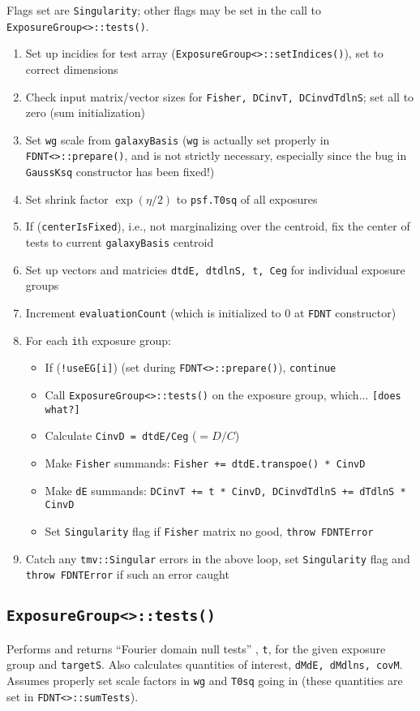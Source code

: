 \documentclass[useAMS,usenatbib,usegraphicx]{mn2e}
\begin{document}
Flags set are {\tt Singularity}; other flags may be set in the call to 
{\tt ExposureGroup<>::tests()}.

\begin{enumerate}
\item Set up incidies for test array ({\tt ExposureGroup<>::setIndices()}), set to correct dimensions
\item Check input matrix/vector sizes for {\tt Fisher, DCinvT, DCinvdTdlnS}; set all to zero 
(sum initialization)
\item Set {\tt wg} scale from {\tt galaxyBasis} ({\tt wg} is actually set properly in 
{\tt FDNT<>::prepare()}, and is not strictly necessary, especially since the bug in {\tt GaussKsq}
constructor has been fixed!)
\item Set shrink factor $\exp(\eta/2)$ to {\tt psf.T0sq} of all exposures
\item If ({\tt centerIsFixed}), i.e., not marginalizing over the centroid, fix the center of tests 
to current {\tt galaxyBasis} centroid
\item Set up vectors and matricies {\tt dtdE, dtdlnS, t, Ceg} for individual exposure groups
\item Increment {\tt evaluationCount} (which is initialized to 0 at {\tt FDNT} constructor)
\item For each {\tt i}th exposure group:
\begin{itemize}
  \item If ({\tt !useEG[i]}) (set during {\tt FDNT<>::prepare()}), {\tt continue}
  \item Call {\tt ExposureGroup<>::tests()} on the exposure group, which... {\tt [does what?]}
  \item Calculate {\tt CinvD = dtdE/Ceg} ($=D/C$)
  \item Make {\tt Fisher} summands: {\tt Fisher += dtdE.transpoe() * CinvD}
  \item Make {\tt dE} summands: {\tt DCinvT += t * CinvD, DCinvdTdlnS += dTdlnS * CinvD}
  \item Set {\tt Singularity} flag if {\tt Fisher} matrix no good, {\tt throw FDNTError}
\end{itemize}
\item Catch any {\tt tmv::Singular} errors in the above loop, set {\tt Singularity} flag and 
{\tt throw FDNTError} if such an error caught
\end{enumerate}

\subsection{\texttt{ExposureGroup<>::tests()}}
Performs and returns ``Fourier domain null tests'' \citep{bernstein:2010}, {\tt t}, 
for the given exposure group and {\tt targetS}.  Also calculates quantities of interest, 
{\tt dMdE, dMdlns, covM}.  Assumes properly set scale factors in {\tt wg} and {\tt T0sq} going in 
(these quantities are set in {\tt FDNT<>::sumTests}).
\end{document}
